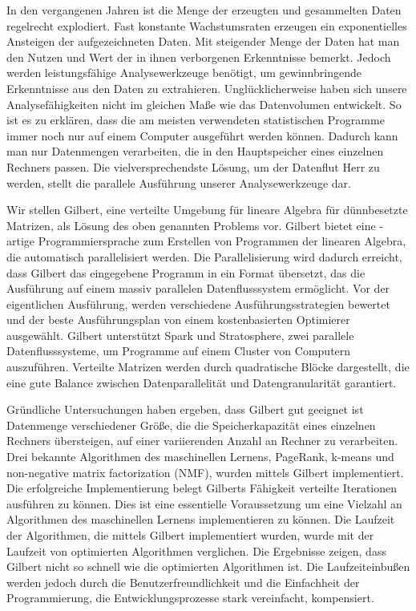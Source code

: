 \clearemptydoublepage
{}
{}	


\vspace*{2cm}
\begin{center}
\end{center}
\vspace{1cm}

In den vergangenen Jahren ist die Menge der erzeugten und gesammelten Daten regelrecht explodiert.
Fast konstante Wachstumsraten erzeugen ein exponentielles Ansteigen der aufgezeichneten Daten.
Mit steigender Menge der Daten hat man den Nutzen und Wert der in ihnen verborgenen Erkenntnisse bemerkt.
Jedoch werden leistungsfähige Analysewerkzeuge benötigt, um gewinnbringende Erkenntnisse aus den Daten zu extrahieren.
Unglücklicherweise haben sich unsere Analysefähigkeiten nicht im gleichen Maße wie das Datenvolumen entwickelt.
So ist es zu erklären, dass die am meisten verwendeten statistischen Programme immer noch nur auf einem Computer ausgeführt werden können.
Dadurch kann man nur Datenmengen verarbeiten, die in den Hauptspeicher eines einzelnen Rechners passen.
Die vielversprechendste Lösung, um der Datenflut Herr zu werden, stellt die parallele Ausführung unserer Analysewerkzeuge dar.

Wir stellen Gilbert, eine verteilte Umgebung für lineare Algebra für dünnbesetzte Matrizen, als Lösung des oben genannten Problems vor.
Gilbert bietet eine \matlab-artige Programmiersprache zum Erstellen von Programmen der linearen Algebra, die automatisch parallelisiert werden.
Die Parallelisierung wird dadurch erreicht, dass Gilbert das eingegebene Programm in ein Format übersetzt, das die Ausführung auf einem massiv parallelen Datenflusssystem ermöglicht.
Vor der eigentlichen Ausführung, werden verschiedene Ausführungsstrategien bewertet und der beste Ausführungsplan von einem kostenbasierten Optimierer ausgewählt.
Gilbert unterstützt Spark und Stratosphere, zwei parallele Datenflusssysteme, um Programme auf einem Cluster von Computern auszuführen.
Verteilte Matrizen werden durch quadratische Blöcke dargestellt, die eine gute Balance zwischen Datenparallelität und Datengranularität garantiert.

Gründliche Untersuchungen haben ergeben, dass Gilbert gut geeignet ist Datenmenge verschiedener Größe, die die Speicherkapazität eines einzelnen Rechners übersteigen, auf einer variierenden Anzahl an Rechner zu verarbeiten.
Drei bekannte Algorithmen des maschinellen Lernens, PageRank, k-means und non-negative matrix factorization (NMF), wurden mittels Gilbert implementiert.
Die erfolgreiche Implementierung belegt Gilberts Fähigkeit verteilte Iterationen ausführen zu können.
Dies ist eine essentielle Voraussetzung um eine Vielzahl an Algorithmen des maschinellen Lernens implementieren zu können.
Die Laufzeit der Algorithmen, die mittels Gilbert implementiert wurden, wurde mit der Laufzeit von optimierten Algorithmen verglichen.
Die Ergebnisse zeigen, dass Gilbert nicht so schnell wie die optimierten Algorithmen ist.
Die Laufzeiteinbußen werden jedoch durch die Benutzerfreundlichkeit und die Einfachheit der Programmierung, die Entwicklungsprozesse stark vereinfacht, kompensiert.
